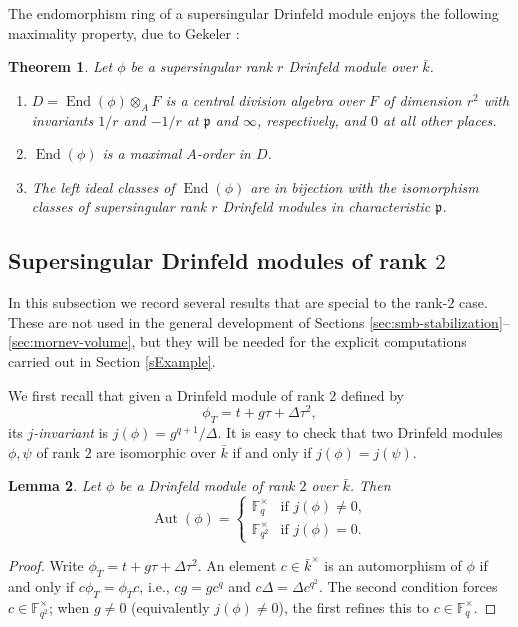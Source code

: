 \documentclass[12pt]{amsart}
\newtheorem{thm}{Theorem}[section]
\newtheorem{lem}[thm]{Lemma}
\theoremstyle{definition}
\theoremstyle{remark}
\numberwithin{equation}{section}
\numberwithin{thm}{section}
\DeclareMathOperator{\End}{End}
\DeclareMathOperator{\Aut}{Aut}
\newcommand{\fp}{\mathfrak{p}}
\newcommand{\F}{\mathbb{F}}
\begin{document}
	The endomorphism ring of a supersingular Drinfeld module enjoys the following
	maximality property, due to Gekeler \cite[Thm.\ 4.3]{Gekeler91}:
	
	\begin{thm}\label{thmGekelerMaxOrder}
		Let $\phi$ be a supersingular rank $r$ Drinfeld module over $\bar{k}$.
		\begin{enumerate}
			\item $D=\End(\phi)\otimes_A F$ is a central division algebra over $F$ of dimension $r^2$
			with invariants $1/r$ and $-1/r$ at $\fp$ and $\infty$, respectively, and $0$ at all other places.
			\item $\End(\phi)$ is a maximal $A$-order in $D$.
			\item The left ideal classes of $\End(\phi)$
			are in bijection with the isomorphism classes of supersingular rank $r$
			Drinfeld modules in characteristic $\fp$.
		\end{enumerate}
	\end{thm}
	
	\subsection{Supersingular Drinfeld modules of rank \texorpdfstring{$2$}{2}}\label{ssSSrank2}
	In this subsection we record several results that are special to the rank-$2$ case. These are not used in the general development of Sections \ref{sec:smb-stabilization}--\ref{sec:mornev-volume}, but they will be needed for the explicit computations carried out in Section \ref{sExample}.
	
	We first recall that given a Drinfeld module of rank $2$ defined by
	\[
	\phi_T=t+g\tau+\Delta\tau^2,
	\]
	its \textit{$j$-invariant} is $j(\phi)=g^{q+1}/\Delta$. It is easy to check that two Drinfeld modules $\phi, \psi$ of rank $2$ are isomorphic over $\bar{k}$ if and only if $j(\phi)=j(\psi)$.
	
	\begin{lem}\label{lemAut}
		Let $\phi$ be a Drinfeld module of rank $2$ over $\bar{k}$. Then
		\[
		\Aut(\phi) =
		\begin{cases}
			\F_q^\times & \text{if } j(\phi) \neq 0, \\
			\F_{q^2}^\times & \text{if } j(\phi) = 0.
		\end{cases}
		\]
	\end{lem}
	
	\begin{proof} %
		Write $\phi_T = t + g\tau + \Delta\tau^2$. An element $c \in \bar{k}^\times$ is an automorphism of $\phi$ if and only if $c\phi_T = \phi_T c$, i.e., $cg = gc^q$ and $c\Delta = \Delta c^{q^2}$. The second condition forces $c \in \F_{q^2}^\times$; when $g \neq 0$ (equivalently $j(\phi) \neq 0$), the first refines this to $c \in \F_q^\times$.
	\end{proof}
	
\end{document}
